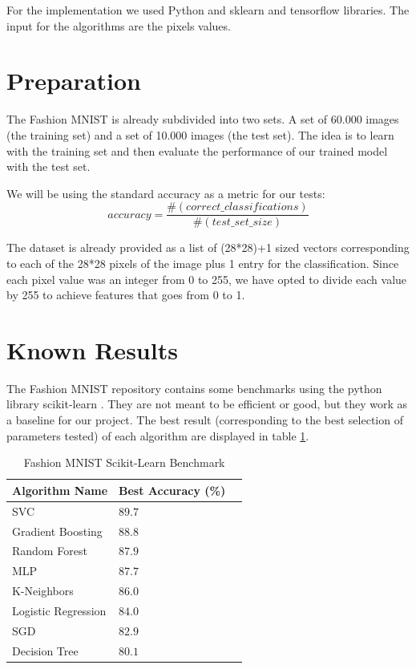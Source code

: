 \documentclass{article}
\begin{document}
    For the implementation we used Python and sklearn\cite{scikitlearn} and tensorflow \cite{tensorflow} libraries. The input for the algorithms are the pixels values.
	


\section{Preparation}

The Fashion MNIST is already subdivided into two sets. A set of 60.000 images (the training set)
and a set of 10.000 images (the test set). The idea is to learn with the training set and then
evaluate the performance of our trained model with the test set.

We will be using the standard accuracy as a metric for our tests:
\begin{equation}
\label{eq:acc}
accuracy = \frac{\#(correct\_classifications)}{\#(test\_set\_size)}
\end{equation}

The dataset is already provided as a list of (28*28)+1 sized vectors corresponding
to each of the 28*28 pixels of the image plus 1 entry for the classification.
Since each pixel value was an integer from 0 to 255, we have opted to divide
each value by 255 to achieve features that goes from 0 to 1.


\section{Known Results}

The Fashion MNIST repository contains some benchmarks using the python library
scikit-learn \cite{scikitlearnbenchmark}. They are not meant
to be efficient or good, but they work as a baseline for our project.
The best result (corresponding to the best selection of parameters tested)
of each algorithm are displayed in table \ref{table:scikit-benchmark}.

\begin{table}
\centering
\begin{tabular}{llr}
\toprule
Algorithm Name & Best Accuracy (\%) \\
\midrule
SVC & $89.7$ \\
Gradient Boosting & $88.8$ \\
Random Forest & $87.9$ \\
MLP & $87.7$ \\
K-Neighbors & $86.0$ \\
Logistic Regression & $84.0$ \\
SGD & $82.9$ \\
Decision Tree & $80.1$ \\
\bottomrule
\end{tabular}
\caption{Fashion MNIST Scikit-Learn Benchmark \cite{scikitlearnbenchmark} }
\label{table:scikit-benchmark}
\end{table}
\end{document}
